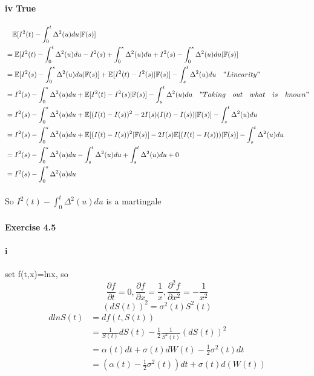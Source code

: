 \documentclass{article}
\begin{document}
\paragraph{iv True}
\begin{align*}
   &\quad \mathbb{E}[I^2(t)-\int_{0}^{t}\Delta^2(u)du|\mathbb{F}(s)] \\
   & =\mathbb{E}[I^2(t)-\int_{0}^{t}\Delta^2(u)du-I^2(s)+\int_{0}^{s}\Delta^2(u)du+I^2(s)-\int_{0}^{s}\Delta^2(u)du|\mathbb{F}(s)] \\
   & = \mathbb{E}[I^2(s)-\int_{0}^{s}\Delta^2(u)du|\mathbb{F}(s)]+\mathbb{E}[I^2(t)-I^2(s)|\mathbb{F}(s)] -\int_{s}^{t}\Delta^2(u)du \quad "Linearity"\\
  & = I^2(s)-\int_{0}^{s}\Delta^2(u)du+\mathbb{E}[I^2(t)-I^2(s)|\mathbb{F}(s)] -\int_{s}^{t}\Delta^2(u)du\quad"Taking\quad out\quad what\quad is\quad known"\\
   & = I^2(s)-\int_{0}^{s}\Delta^2(u)du+\mathbb{E}[(I(t)-I(s))^2-2I(s)(I(t)-I(s))|\mathbb{F}(s)] -\int_{s}^{t}\Delta^2(u)du\\
  & =I^2(s)-\int_{0}^{s}\Delta^2(u)du+\mathbb{E}[(I(t)-I(s))^2|\mathbb{F}(s)] -2I(s)\mathbb{E}[(I(t)-I(s)))|\mathbb{F}(s)]-\int_{s}^{t}\Delta^2(u)du\\
  &=I^2(s)-\int_{0}^{s}\Delta^2(u)du-\int_{s}^{t}\Delta^2(u)du+\int_{s}^{t}\Delta^2(u)du+0\\
  &=I^2(s)-\int_{0}^{s}\Delta^2(u)du
\end{align*}
\paragraph{}{So $I^2(t)-\int_{0}^{t}\Delta^2(u)du$ is a martingale }
\paragraph{Exercise 4.5}
\paragraph{i}{set f(t,x)=lnx, so }
\begin{displaymath}
   \frac{\partial f}{\partial t}=0,\frac{\partial f}{\partial x}=\frac{1}{x},\frac{\partial^2 f}{\partial x^2}=-\frac{1}{x^2}
\end{displaymath}
\begin{displaymath}
  (dS(t))^2=\sigma^2(t)S^2(t)
\end{displaymath}
\begin{align*}
  dlnS(t) & =df(t,S(t)) \\
   & =\frac{1}{S(t)}dS(t)-\frac{1}{2}\frac{1}{S^{2}(t)}(dS(t))^2 \\
   & =\alpha(t)dt+\sigma(t)dW(t)-\frac{1}{2}\sigma^2(t)dt \\
   & =(\alpha(t)-\frac{1}{2}\sigma^2(t))dt+\sigma(t)d(W(t)) \\
\end{align*}
\end{document}

